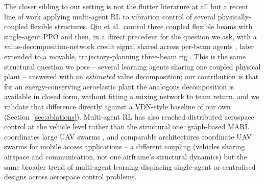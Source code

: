 \documentclass[preprint,11pt]{elsarticle}
\begin{document}
The closer sibling to our setting is not the flutter literature at all but
a recent line of work applying multi-agent RL to vibration control of
several physically-coupled flexible structures. Qiu et al.\ control three
coupled flexible beams with single-agent PPO
\cite{qiu2022ppobeams} and then, in a direct precedent for the
question we ask, with a value-decomposition-network credit signal shared
across per-beam agents \cite{qiu2022vdnbeams}, later extended to a
movable, trajectory-planning three-beam rig \cite{liu2025tshapebeam}. This
is the same structural question we pose -- several learning agents
sharing one coupled physical plant -- answered with an
\emph{estimated} value decomposition; our contribution is that for an
energy-conserving aeroelastic plant the analogous decomposition is
available in closed form, without fitting a mixing network to team
return, and we validate that difference directly against a VDN-style
baseline of our own (Section~\ref{sec:ablations}). Multi-agent RL has also
reached distributed aerospace control at the vehicle level rather than the
structural one: graph-based MARL coordinates large UAV swarms
\cite{zhao2024uavswarm}, and comparable architectures coordinate UAV
swarms for mobile access applications \cite{park2023uavswarm} -- a
different coupling (vehicles sharing airspace and communication, not one
airframe's structural dynamics) but the same broader trend of multi-agent
learning displacing single-agent or centralised designs across aerospace
control problems.
\end{document}
